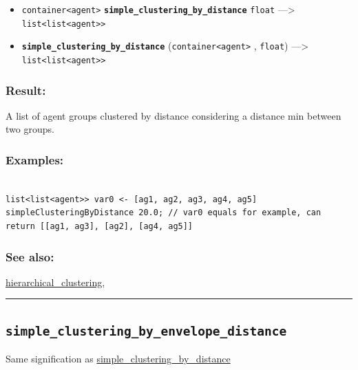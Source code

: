 \documentclass[]{book}
\providecommand{\tightlist}{%
  \setlength{\itemsep}{0pt}\setlength{\parskip}{0pt}}
\theoremstyle{definition}
\theoremstyle{definition}
\theoremstyle{definition}
\theoremstyle{remark}
\begin{document}
\begin{itemize}
\tightlist
\item
  \texttt{container\textless{}agent\textgreater{}}
  \textbf{\texttt{simple\_clustering\_by\_distance}} \texttt{float}
  ---\textgreater{}
  \texttt{list\textless{}list\textless{}agent\textgreater{}\textgreater{}}
\item
  \textbf{\texttt{simple\_clustering\_by\_distance}}
  (\texttt{container\textless{}agent\textgreater{}} , \texttt{float})
  ---\textgreater{}
  \texttt{list\textless{}list\textless{}agent\textgreater{}\textgreater{}}
\end{itemize}

\subsubsection{Result:}\label{result-457}

A list of agent groups clustered by distance considering a distance min
between two groups.

\subsubsection{Examples:}\label{examples-329}

\begin{verbatim}
 
list<list<agent>> var0 <- [ag1, ag2, ag3, ag4, ag5] simpleClusteringByDistance 20.0; // var0 equals for example, can return [[ag1, ag3], [ag2], [ag4, ag5]]
\end{verbatim}

\subsubsection{See also:}\label{see-also-184}

\href{operators-d-to-h.html\#hierarchical_clustering}{hierarchical\_clustering},

\begin{center}\rule{0.5\linewidth}{\linethickness}\end{center}

\subsection{\texorpdfstring{\texttt{simple\_clustering\_by\_envelope\_distance}}{simple\_clustering\_by\_envelope\_distance}}\label{simple_clustering_by_envelope_distance}

Same signification as
\href{operators-s-to-z.html\#simple_clustering_by_distance}{simple\_clustering\_by\_distance}
\end{document}
